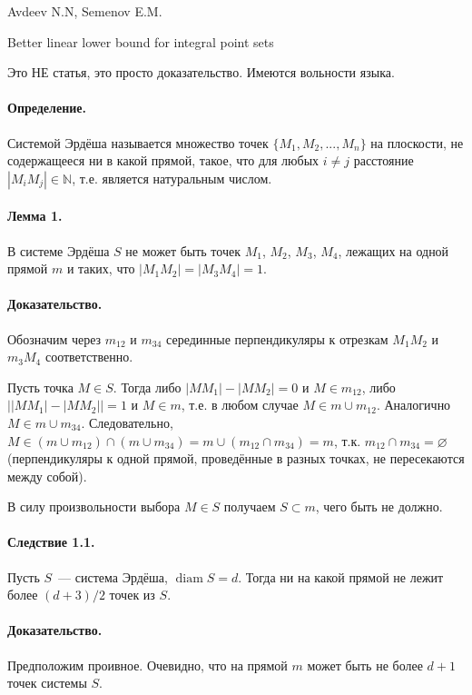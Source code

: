 \documentclass[a4paper,14pt]{article} %
\begin{document}
\renewcommand{\bibname}{Список цитированной литературы}
\renewcommand\refname{\bibname}

Avdeev N.N, Semenov E.M.

Better linear lower bound for integral point sets


Это НЕ статья, это просто доказательство.
Имеются вольности языка.

\paragraph{Определение.}
Системой Эрдёша называется множество точек $\{M_1, M_2, ..., M_n\}$ на плоскости, не содержащееся ни в какой прямой,
такое, что для любых $i\neq j$ расстояние $|M_i M_j| \in \mathbb{N}$,
т.е. является натуральным числом.

\paragraph{Лемма 1.}
В системе Эрдёша $S$ не может быть точек $M_1$, $M_2$, $M_3$, $M_4$,
лежащих на одной прямой $m$ и таких, что $|M_1 M_2| = |M_3 M_4| = 1$.

\paragraph{Доказательство.}
Обозначим через $m_{12}$ и $m_{34}$ серединные перпендикуляры к отрезкам $M_1 M_2$ и $m_3 M_4$ соответственно.

Пусть точка $M\in S$.
Тогда либо $|MM_1| - |MM_2| = 0$ и $M\in m_{12}$, либо $\left||MM_1| - |MM_2|\right| = 1$ и $M\in m$,
т.е. в любом случае $M\in m \cup m_{12}$.
Аналогично $M\in m \cup m_{34}$.
Следовательно, $M\in (m \cup m_{12}) \cap (m \cup m_{34}) = m \cup (m_{12} \cap m_{34}) = m$,
т.к. $m_{12} \cap m_{34} = \varnothing$ (перпендикуляры к одной прямой, проведённые в разных точках, не пересекаются между собой).

В силу произвольности выбора $M \in S$ получаем $S \subset m$, чего быть не должно.


\paragraph{Следствие 1.1.}
Пусть $S$~--- система Эрдёша, $\mathop{diam} S = d$.
Тогда ни на какой прямой не лежит более $(d+3)/2$ точек из $S$.

\paragraph{Доказательство.}
Предположим проивное.
Очевидно, что на прямой $m$ может быть не более $d+1$ точек системы $S$.
\end{document}

